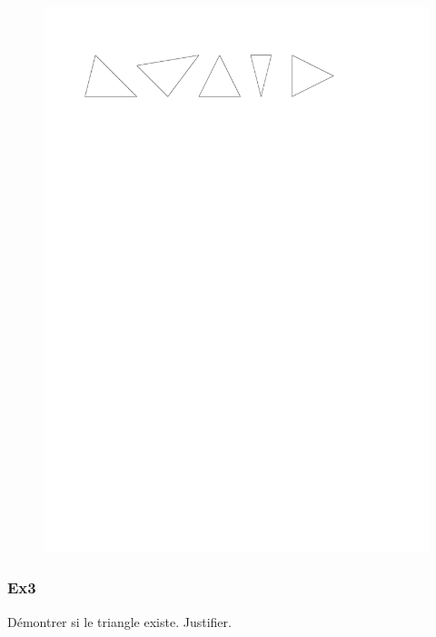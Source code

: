 \documentclass[11pt]{article}
\begin{document}
\begin{figure}[H]
  \centering
  \includegraphics[width=\linewidth]{5x2-triangles/sources/ex1.1.pdf}
\end{figure}

\subsubsection*{Ex3}

Démontrer si le triangle existe. Justifier.
\end{document}
